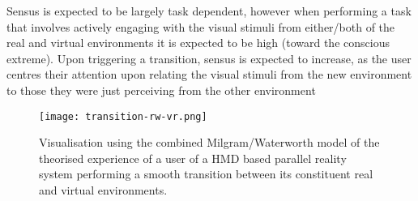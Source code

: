 Sensus is expected to be largely task dependent, however when performing a task that involves actively engaging with the visual stimuli from either/both of the real and virtual environments it is expected to be high (toward the conscious extreme). Upon triggering a transition, sensus is expected to increase, as the user centres their attention upon relating the visual stimuli from the new environment to those they were just perceiving from the other environment



\begin{figure}[h]
	\begin{center}
		\texttt{[image: transition-rw-vr.png]}
		\caption{Visualisation using the combined Milgram/Waterworth model of the theorised experience of a user of a HMD based parallel reality system performing a smooth transition between its constituent real and virtual environments.}
		\label{focus-locus-sensus-with-virtuality-continuum-with-transition}
	\end{center}	
\end{figure}





